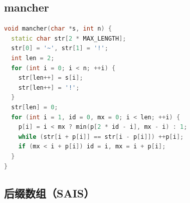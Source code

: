 \documentclass[twoside]{article}
\begin{document}
\subsection{mancher}
\begin{lstlisting}[language=c++]
void mancher(char *s, int n) {
  static char str[2 * MAX_LENGTH];
  str[0] = '~', str[1] = '!';
  int len = 2;
  for (int i = 0; i < n; ++i) {
    str[len++] = s[i];
    str[len++] = '!';
  }
  str[len] = 0;
  for (int i = 1, id = 0, mx = 0; i < len; ++i) {
    p[i] = i < mx ? min(p[2 * id - i], mx - i) : 1;
    while (str[i + p[i]] == str[i - p[i]]) ++p[i];
    if (mx < i + p[i]) id = i, mx = i + p[i];
  }
}

\end{lstlisting}
\subsection{后缀数组（SAIS）}
\end{document}
